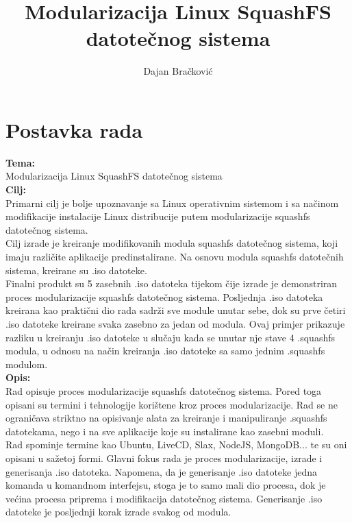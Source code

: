\documentclass[12pt,vi]{mitthesis}
\begin{document}
\author{Dajan Bračković}
\title{Modularizacija Linux SquashFS datotečnog sistema}

\maketitle

\tableofcontents{}

\chapter*{Postavka rada}
\noindent
\textbf{Tema:}\\
\indent
Modularizacija Linux SquashFS datotečnog sistema\\
\noindent
\textbf{Cilj:}\\
\indent
Primarni cilj je bolje upoznavanje sa Linux operativnim sistemom i sa načinom modifikacije instalacije Linux distribucije putem modularizacije squashfs datotečnog sistema.\\
Cilj izrade je kreiranje modifikovanih modula squashfs datotečnog sistema, koji imaju različite aplikacije predinstalirane. Na osnovu modula squashfs datotečnih sistema, kreirane su .iso datoteke.\\
Finalni produkt su 5 zasebnih .iso datoteka tijekom čije izrade je demonstriran proces modularizacije squashfs datotečnog sistema. Posljednja .iso datoteka kreirana kao praktični dio rada sadrži sve module unutar sebe, dok su prve četiri .iso datoteke kreirane svaka zasebno za jedan od modula. Ovaj primjer prikazuje razliku u kreiranju .iso datoteke u slučaju kada se unutar nje stave 4 .squashfs modula, u odnosu na način kreiranja .iso datoteke sa samo jednim .squashfs modulom.\\
\noindent
\textbf{Opis:}\\
\indent
Rad opisuje proces modularizacije squashfs datotečnog sistema. Pored toga opisani su termini i tehnologije korištene kroz proces modularizacije. Rad se ne ograničava striktno na opisivanje alata za kreiranje i manipuliranje .squashfs datotekama, nego i na sve aplikacije koje su instalirane kao zasebni moduli.\\
\indent
Rad spominje termine kao Ubuntu, LiveCD, Slax, NodeJS, MongoDB... te su oni opisani u sažetoj formi. Glavni fokus rada je proces modularizacije, izrade i generisanja .iso datoteka. Napomena, da je generisanje .iso datoteke jedna komanda u komandnom interfejsu,  stoga je to samo mali dio procesa, dok je većina procesa priprema i modifikacija datotečnog sistema. Generisanje .iso datoteke je posljednji korak izrade svakog od modula.
\end{document}
